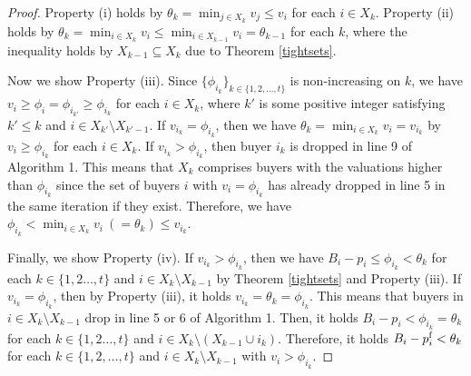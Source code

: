 \documentclass[letterpaper,11pt]{article}
\begin{document}
\begin{proof}
Property (i) holds by $\displaystyle \theta_k=\min_{j\in X_k}v_j\leq v_i$ for each $i\in X_k$.
Property (ii) holds by $\displaystyle \theta_k=\min_{i\in X_k}v_i\leq \min_{i\in X_{k-1}}v_i= \theta_{k-1}$ for each $k$, 
where the inequality holds by $X_{k-1}\subseteq X_{k}$ due to Theorem \ref{tightsets}.

Now we show Property (iii). Since $\{\phi_{i_k}\}_{k\in \{1,2,\ldots,t\}}$ is non-increasing on $k$, 
we have $v_i\geq \phi_i=\phi_{i_{k'}}\geq \phi_{i_k}$ for each $i\in X_k$, 
where $k'$ is some positive integer satisfying $k'\leq k$ and $i\in X_{k'}\setminus X_{k'-1}$.
If $v_{i_k}=\phi_{i_k}$, then we have $\displaystyle \theta_k=\min_{i\in X_k}v_i=v_{i_k}$ 
by $v_i\geq \phi_{i_k}$ for each $i\in X_k$.
If $v_{i_k}>\phi_{i_k}$, then buyer $i_k$ is dropped in line 9 of Algorithm 1.
This means that $X_k$ comprises buyers with the valuations higher than $\phi_{i_k}$ 
since the set of buyers $i$ with $v_{i}=\phi_{i_k}$ has already dropped in line 5 in the same iteration 
if they exist. Therefore, we have $\displaystyle \phi_{i_k}<\min_{i\in X_k}v_i\ (=\theta_k) \leq v_{i_k}$.

Finally, we show Property (iv).
If $v_{i_k}>\phi_{i_k}$, then we have $B_i-p_i\leq \phi_{i_k}<\theta_k$ 
for each $k\in \{1,2\ldots,t\}$ and $i\in X_k\setminus X_{k-1}$ by Theorem \ref{tightsets} and Property (iii). 
If $v_{i_k}=\phi_{i_k}$, then by Property (iii), it holds $v_{i_k}=\theta_k=\phi_{i_k}$.
This means that buyers in $i\in X_{k}\setminus X_{k-1}$ drop in line 5 or 6 of Algorithm 1. 
Then, it holds $B_i-p_i< \phi_{i_k}=\theta_k$ for each $k\in \{1,2\ldots,t\}$ and $i\in X_k\setminus (X_{k-1}\cup i_k)$.
Therefore, it holds $B_i-p^{\rm f}_i<\theta_{k}$ for each 
$k\in\{1,2,\ldots,t\}$ and $i\in X_k\setminus X_{k-1}$ with $v_i>\phi_{i_k}$.
\end{proof}
\end{document}
